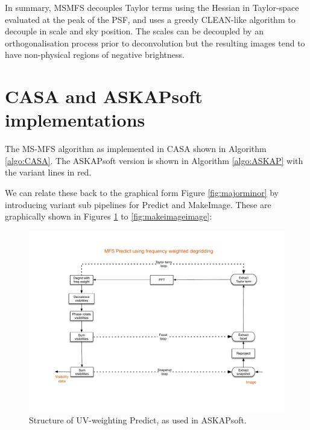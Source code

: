 \documentclass[11pt,a4paper,variablewidth]{article}
\begin{document}
In summary, MSMFS decouples Taylor terms using the Hessian in Taylor-space evaluated at the peak of the PSF, and uses a greedy CLEAN-like algorithm to decouple in scale and sky position. The scales can be decoupled by an orthogonalisation process prior to deconvolution but the resulting images tend to have non-physical regions of negative brightness.



\clearpage
\section{CASA and ASKAPsoft implementations}

The MS-MFS algorithm as implemented in CASA shown in Algorithm \ref{algo:CASA}. The ASKAPsoft version is shown in Algorithm \ref{algo:ASKAP} with the variant lines in red.

We can relate these back to the graphical form Figure \ref{fig:majorminor} by introducing variant sub pipelines for Predict and MakeImage. These are graphically shown in Figures \ref{fig:predictuv} to \ref{fig:makeimageimage}: 

\begin{figure}[htb]
  \centering
  \includegraphics[width=\textwidth]{./MSMFS_Predict_UV.pdf}
  \caption{Structure of UV-weighting Predict, as used in ASKAPsoft. }
  \label{fig:predictuv}
\end{figure}
\end{document}
